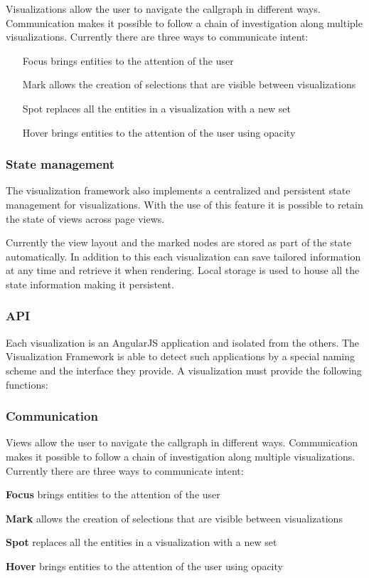 Visualizations allow the user to navigate the callgraph in different ways. Communication makes it possible to follow a chain of investigation along multiple visualizations. Currently there are three ways to communicate intent:

\begin{itemize}
	\item[Focus] brings entities to the attention of the user
	\item[Mark] allows the creation of selections that are visible between visualizations
	\item[Spot] replaces all the entities in a visualization with a new set
	\item[Hover] brings entities to the attention of the user using opacity
\end{itemize}

\subsubsection{State management}

The visualization framework also implements a centralized and persistent state management for visualizations. With the use of this feature it is possible to retain the state of views across page views.

Currently the view layout and the marked nodes are stored as part of the state automatically. In addition to this each visualization can save tailored information at any time and retrieve it when rendering. Local storage is used to house all the state information making it persistent.

\subsubsection{API}
Each visualization is an AngularJS application and isolated from the others. The Visualization Framework is able to detect such applications by a special naming scheme and the interface they provide. A visualization must provide the following functions:

\subsubsection{Communication}

Views allow the user to navigate the callgraph in different ways. Communication makes it possible to follow a chain of investigation along multiple visualizations. Currently there are three ways to communicate intent:

\textbf{Focus} brings entities to the attention of the user

\textbf{Mark} allows the creation of selections that are visible between visualizations

\textbf{Spot} replaces all the entities in a visualization with a new set

\textbf{Hover} brings entities to the attention of the user using opacity